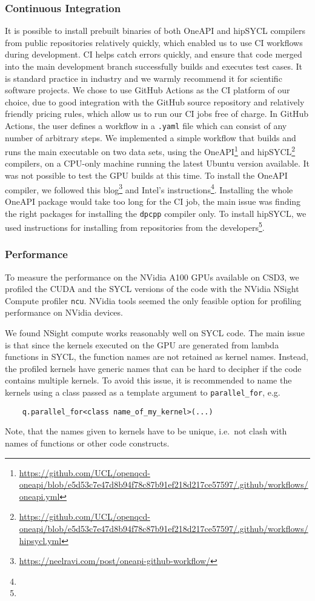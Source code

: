 \documentclass[../main]{subfiles}
\begin{document}
\subsubsection{Continuous Integration}

It is possible to install prebuilt binaries of both OneAPI and hipSYCL compilers from public repositories relatively quickly, which enabled us to use CI workflows during development.
CI helps catch errors quickly, and ensure that code merged into the main development branch successfully builds and executes test cases.
It is standard practice in industry and we warmly recommend it for scientific software projects.
We chose to use GitHub Actions as the CI platform of our choice, due to good integration with the GitHub source repository and relatively friendly pricing rules, which allow us to run our CI jobs free of charge.
In GitHub Actions, the user defines a workflow in a \verb #.yaml# file which can consist of any number of arbitrary steps.
We implemented a simple workflow that builds and runs the main executable on two data sets, using the OneAPI\footnote{\url{https://github.com/UCL/openqcd-oneapi/blob/e5d53c7e47d8b94f78c87b91ef218d217ce57597/.github/workflows/oneapi.yml}} and hipSYCL\footnote{\url{https://github.com/UCL/openqcd-oneapi/blob/e5d53c7e47d8b94f78c87b91ef218d217ce57597/.github/workflows/hipsycl.yml}} compilers, on a CPU-only machine running the latest Ubuntu version available.
It was not possible to test the GPU builds at this time.
To install the OneAPI compiler, we followed this blog\footnote{\url{https://neelravi.com/post/oneapi-github-workflow/}} and Intel's instructions\footnote{\oneapiaptinstall}.
Installing the whole OneAPI package would take too long for the CI job, the main issue was finding the right packages for installing the \verb #dpcpp# compiler only.
To install hipSYCL, we used instructions for installing from repositories from the developers\footnote{\hipsyclinstallfromrepos}.

\subsubsection{Performance}\label{sec:openqcd_performance}

To measure the performance on the NVidia A100 GPUs available on CSD3, we profiled the CUDA and the SYCL versions of the code with the NVidia NSight Compute profiler \texttt{ncu}.
NVidia tools seemed the only feasible option for profiling performance on NVidia devices.

We found NSight compute works reasonably well on SYCL code.
The main issue is that since the kernels executed on the GPU are generated from lambda functions in SYCL, the function names are not retained as kernel names.
Instead, the profiled kernels have generic names that can be hard to decipher if the code contains multiple kernels.
To avoid this issue, it is recommended to name the kernels using a class passed as a template argument to \verb #parallel_for#, e.g.
\begin{verbatim}
    q.parallel_for<class name_of_my_kernel>(...)
\end{verbatim}
Note, that the names given to kernels have to be unique, i.e.\ not clash with names of functions or other code constructs.
\end{document}
